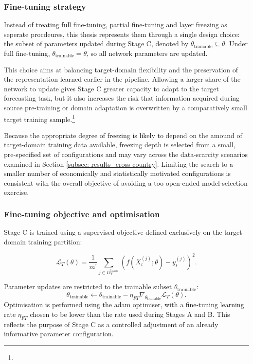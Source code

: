 \subsubsection{Fine-tuning strategy}
Instead of treating full fine-tuning, partial fine-tuning and layer freezing as seperate procdeures, this thesis represents them through a single design choice: the subset of parameters updated during Stage C, denoted by $\theta_\text{trainable}\subseteq \theta$. Under full fine-tuning, $\theta_\text{trainable}=\theta$, so all network parameters are updated. 

This choice aims at balancing target-domain flexibility and the preservation of the representation learned earlier in the pipeline. Allowing a larger share of the network to update gives Stage C greater capacity to adapt to the target forecasting task, but it also increases the risk that information acquired during source pre-training or domain adaptation is overwritten by a comparatively small target training sample.\footnote{}

Because the appropriate degree of freezing is likely to depend on the amound of target-domain training data available, freezing depth is selected from a small, pre-specified set of configurations and may vary across the data-scarcity scenarios examined in Section \ref{subsec: results_cross country}. Limiting the search to a smaller number of economically and statistically motivated configurations is consistent with the overall objective of avoiding a too open-ended model-selection exercise.

\subsubsection{Fine-tuning objective and optimisation} \label{subsubsec: methodology_stage c_fine-tuning objective and optimisation}
Stage C is trained using a supervised objective defined exclusively on the target-domain training partition:

\begin{equation}
\mathcal{L}_T(\theta)=\frac{1}{m^{\prime}} \sum_{j \in D_T^{\text {train }}}\left(f\left(X_t^{(j)} ; \theta\right)-y_t^{(j)}\right)^2.
\end{equation}

\noindent Parameter updates are restricted to the trainable subset $\theta_\text{trainable}$:
\begin{equation}
\theta_\text{trainable}\leftarrow \theta_\text{trainable}-\eta_{FT} \nabla_{\theta_{\text{trainable}}} \mathcal{L}_T(\theta).
\end{equation}
\noindent Optimisation is performed using the \ac{adam} optimiser, with a fine-tuning learning rate $\eta_{FT}$ chosen to be lower than the rate used during Stages A and B. This reflects the purpose of Stage C as a controlled adjustment of an already informative parameter configuration.

